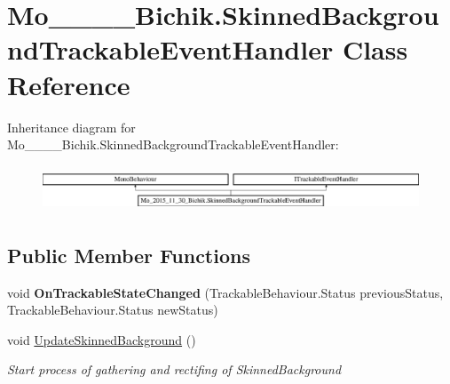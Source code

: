 \hypertarget{class_mo__2015__11__30___bichik_1_1_skinned_background_trackable_event_handler}{}\section{Mo\+\_\+\_\+\_\+\_\+\+Bichik.\+Skinned\+Background\+Trackable\+Event\+Handler Class Reference}
\label{class_mo__2015__11__30___bichik_1_1_skinned_background_trackable_event_handler}
Inheritance diagram for Mo\+\_\+\_\+\_\+\_\+\+Bichik.\+Skinned\+Background\+Trackable\+Event\+Handler\+:\begin{figure}[H]
\begin{center}
\leavevmode
\includegraphics[height=1.379310cm]{class_mo__2015__11__30___bichik_1_1_skinned_background_trackable_event_handler}
\end{center}
\end{figure}
\subsection*{Public Member Functions}
\begin{DoxyCompactItemize}
\item 
\hypertarget{class_mo__2015__11__30___bichik_1_1_skinned_background_trackable_event_handler_a8e2a8b2c595f211bd96b3b07290d4511}{}void {\bfseries On\+Trackable\+State\+Changed} (Trackable\+Behaviour.\+Status previous\+Status, Trackable\+Behaviour.\+Status new\+Status)\label{class_mo__2015__11__30___bichik_1_1_skinned_background_trackable_event_handler_a8e2a8b2c595f211bd96b3b07290d4511}

\item 
void \hyperlink{class_mo__2015__11__30___bichik_1_1_skinned_background_trackable_event_handler_a5acc4c7e682ffb65ea3ee251767f6f42_a5acc4c7e682ffb65ea3ee251767f6f42}{Update\+Skinned\+Background} ()
\begin{DoxyCompactList}\small\item\em Start process of gathering and rectifing of Skinned\+Background \end{DoxyCompactList}\end{DoxyCompactItemize}
